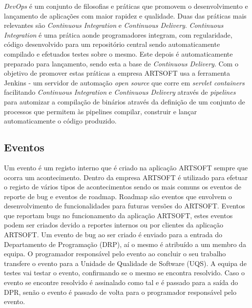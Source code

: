 \documentclass[sigplan]{acmart}
\begin{document}
\textit{DevOps} é um conjunto de filosofias e práticas que promovem o desenvolvimento e lançamento de aplicações com maior rapidez e qualidade. Duas das práticas mais relevantes são \textit{Continuous Integration} e \textit{Continuous Delivery}. \textit{Continuous Integration} é uma prática aonde programadores integram, com regularidade, código desenvolvido para um repositório central sendo automaticamente compilado e efetuados testes sobre o mesmo. Este depois é automaticamente preparado para lançamento, sendo esta a base de \textit{Continuous Delivery}. Com o objetivo de promover estas práticas a empresa ARTSOFT usa a ferramenta Jenkins - um servidor de automação \textit{open source} que corre em \textit{servlet containers} facilitando \textit{Continuous Integration} e \textit{Continuous Delivery} através de \textit{pipelines} para automizar a compilação de binários através da definição de um conjunto de processos que permitem às pipelines compilar, construir e lançar automaticamente o código produzido.


\subsection{Eventos}

Um evento é um registo interno que é criado na aplicação ARTSOFT sempre que ocorra um acontecimento. Dentro da empresa ARTSOFT é utilizado para efetuar o registo de vários tipos de acontecimentos sendo os mais comuns os eventos de reporte de bug e eventos de roadmap. Roadmap são eventos que envolvem o desenvolvimento de funcionalidades para futuras versões do ARTSOFT. Eventos que reportam bugs no funcionamento da aplicação ARTSOFT, estes eventos podem ser criados devido a reportes internos ou por clientes da aplicação ARTSOFT. Um evento de bug ao ser criado é enviado para a entrada do Departamento de Programação (DRP), aí o mesmo é atribuído a um membro da equipa. O programador responsável pelo evento ao concluir o seu trabalho transfere o evento para a Unidade de Qualidade de Software (UQS). A equipa de testes vai testar o evento, confirmando se o mesmo se encontra resolvido. Caso o evento se encontre resolvido é assinalado como tal e é passado para a saída do DPR, senão o evento é passado de volta para o programador responsável pelo evento.
\end{document}
